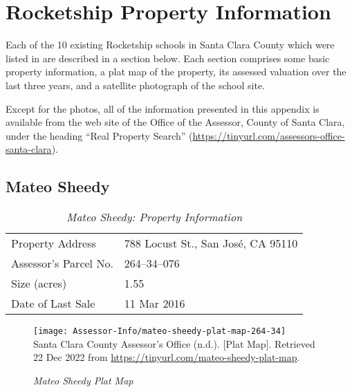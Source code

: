 
\chapter{Rocketship Property Information}\label{ch:rocketship-property-info}
\bigskip%
Each of the 10 existing Rocketship schools in Santa Clara County which were listed in  are described in a section below. Each section comprises some basic property information, a plat map of the property, its assessed valuation over the last three years, and a satellite photograph of the school site.

Except for the photos, all of the information presented in this appendix is available from the web site of the Office of the Assessor, County of Santa Clara, under the heading ``Real Property Search'' (\url{https://tinyurl.com/assessors-office-santa-clara}).

\clearpage


\section{Mateo Sheedy}\label{sec:mateo-sheedy-info}
\begin{table}[htb]
  \SingleSpacing%
  \caption[Mateo Sheedy: Property Information]{\textit{Mateo Sheedy: Property Information}}\label{tab:mateo-sheedy-prop-info}
  \begin{tabular}{ll}
    \toprule
    Property Address      & 788 Locust St., San José, CA 95110 \\
    Assessor's Parcel No. &  264–34–076 \\
    Size (acres)          & 1.55 \\
    Date of Last Sale     & 11 Mar 2016 \\
    \bottomrule
  \end{tabular}
\end{table}

\begin{figure}[hbt]
    \caption[Mateo Sheedy Plat Map]{\textit{Mateo Sheedy Plat Map}}\label{fig:mateo-sheedy-plat-map}
    \texttt{[image: Assessor-Info/mateo-sheedy-plat-map-264-34]}\\ %
    \footnotesize{Santa Clara County Assessor's Office (n.d.). [Plat Map]. Retrieved 22 Dec 2022 from  \url{https://tinyurl.com/mateo-sheedy-plat-map}}.
\end{figure}

